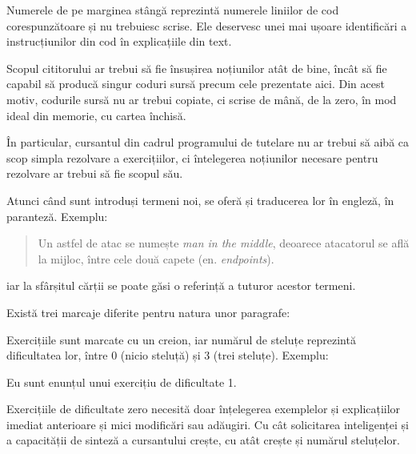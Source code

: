 Numerele de pe marginea stângă reprezintă numerele liniilor de cod
corespunzătoare și nu trebuiesc scrise. Ele deservesc unei mai ușoare
identificări a instrucțiunilor din cod în explicațiile din text.

Scopul cititorului ar trebui să fie însușirea noțiunilor atât de bine, încât
să fie capabil să producă singur coduri sursă precum cele prezentate aici. Din
acest motiv, codurile sursă nu ar trebui copiate, ci scrise de mână, de la zero,
în mod ideal din memorie, cu cartea închisă.

În particular, cursantul din cadrul programului de tutelare {\phpro} nu ar
trebui să aibă ca scop simpla rezolvare a exercițiilor, ci întelegerea
noțiunilor necesare pentru rezolvare ar trebui să fie scopul său.

Atunci când sunt introduși termeni noi, se oferă și traducerea lor în engleză,
în paranteză.  Exemplu: \begin{quote} Un astfel de atac se numește \textsl{man
in the middle}, deoarece atacatorul se află la mijloc, între cele două
capete (en.  \textsl{endpoints}).  \end{quote} iar la sfârșitul cărții se poate
găsi o referință a tuturor acestor termeni.

Există trei marcaje diferite pentru natura unor paragrafe:




Exercițiile sunt marcate cu un creion, iar numărul de steluțe reprezintă
dificultatea lor, între 0 (nicio steluță) și 3 (trei steluțe). Exemplu:

\begin{Exercise*}[title={Exercițiu de dificultate 1},difficulty=1]

Eu sunt enunțul unui exercițiu de dificultate 1.

\end{Exercise*}

Exercițiile de dificultate zero necesită doar înțelegerea exemplelor și
explicațiilor imediat anterioare și mici modificări sau adăugiri.  Cu cât
solicitarea inteligenței și a capacității de sinteză a cursantului crește, cu
atât crește și numărul steluțelor.


